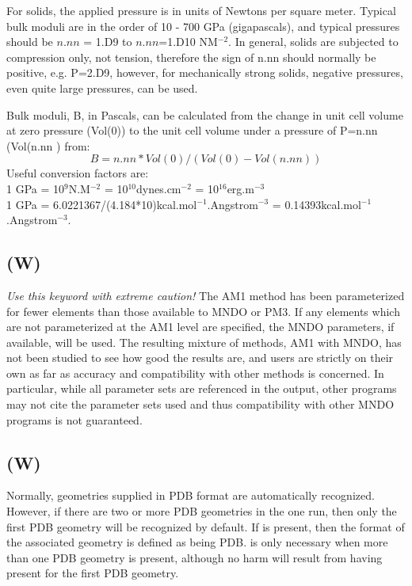 For solids, the applied pressure is in units of Newtons per square
meter. Typical bulk moduli are in the order of 10 - 700 GPa
(gigapascals), and typical pressures should be $n.nn$ = 1.D9 to
$n.nn$=1.D10 NM$^{-2}$. In general, solids are subjected to compression only,
not tension, therefore the sign of n.nn should normally be
positive, e.g. P=2.D9, however, for mechanically strong solids,
negative pressures, even quite large pressures, can be used.

 Bulk moduli, B, in Pascals, can be calculated from the change in unit
cell volume at zero pressure (Vol(0)) to the unit cell volume
under a pressure of P=n.nn (Vol(n.nn ) from:
$$
B=n.nn*Vol(0)/(Vol(0)-Vol(n.nn))
$$
 Useful conversion factors are:\\
 1 GPa = 10$^9$N.M$^{-2}$ = 10$^{10}$dynes.cm$^{-2}$ = 10$^{16}$erg.m$^{-3}$\\
 1 GPa = 6.0221367/(4.184*10)kcal.mol$^{-1}$.Angstrom$^{-3}$ =
0.14393kcal.mol$^{-1}$.Angstrom$^{-3}$.


\subsection*{ (W)} 
   \emph{Use this keyword with extreme caution!} The  AM1  method
   has  been parameterized  for fewer elements than those available to
   MNDO or PM3.  If any elements which are  not  parameterized  at
   the  AM1 level  are  specified,  the  MNDO parameters, if available,
   will be used.  The resulting mixture of methods, AM1 with MNDO, has
   not been studied  to see  how good the results are, and users are
   strictly on their own as far as accuracy and  compatibility  with
   other  methods  is  concerned.   In particular,  while all parameter
   sets are referenced in the output, other programs may not cite the
   parameter sets used and thus compatibility with other MNDO programs
   is not guaranteed.

\subsection*{ (W)}
Normally, geometries supplied in PDB format are automatically recognized.
However, if there are two or more PDB geometries in the one run, then only
the first PDB geometry will be recognized by default.  If  is present,
then the format of the associated geometry is defined as being PDB.
 is only necessary when more than one PDB geometry is present,
although no harm will result from having  present for the first
PDB geometry.

